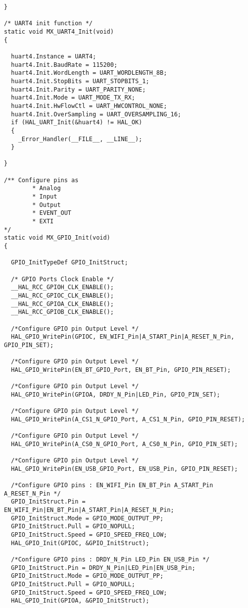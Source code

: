 \begin{lstlisting}[label=algoritmo:main.c,style = STM-code,frame=single,caption=main.c]
}

/* UART4 init function */
static void MX_UART4_Init(void)
{

  huart4.Instance = UART4;
  huart4.Init.BaudRate = 115200;
  huart4.Init.WordLength = UART_WORDLENGTH_8B;
  huart4.Init.StopBits = UART_STOPBITS_1;
  huart4.Init.Parity = UART_PARITY_NONE;
  huart4.Init.Mode = UART_MODE_TX_RX;
  huart4.Init.HwFlowCtl = UART_HWCONTROL_NONE;
  huart4.Init.OverSampling = UART_OVERSAMPLING_16;
  if (HAL_UART_Init(&huart4) != HAL_OK)
  {
    _Error_Handler(__FILE__, __LINE__);
  }

}

/** Configure pins as 
        * Analog 
        * Input 
        * Output
        * EVENT_OUT
        * EXTI
*/
static void MX_GPIO_Init(void)
{

  GPIO_InitTypeDef GPIO_InitStruct;

  /* GPIO Ports Clock Enable */
  __HAL_RCC_GPIOH_CLK_ENABLE();
  __HAL_RCC_GPIOC_CLK_ENABLE();
  __HAL_RCC_GPIOA_CLK_ENABLE();
  __HAL_RCC_GPIOB_CLK_ENABLE();

  /*Configure GPIO pin Output Level */
  HAL_GPIO_WritePin(GPIOC, EN_WIFI_Pin|A_START_Pin|A_RESET_N_Pin, GPIO_PIN_SET);

  /*Configure GPIO pin Output Level */
  HAL_GPIO_WritePin(EN_BT_GPIO_Port, EN_BT_Pin, GPIO_PIN_RESET);

  /*Configure GPIO pin Output Level */
  HAL_GPIO_WritePin(GPIOA, DRDY_N_Pin|LED_Pin, GPIO_PIN_SET);

  /*Configure GPIO pin Output Level */
  HAL_GPIO_WritePin(A_CS1_N_GPIO_Port, A_CS1_N_Pin, GPIO_PIN_RESET);

  /*Configure GPIO pin Output Level */
  HAL_GPIO_WritePin(A_CS0_N_GPIO_Port, A_CS0_N_Pin, GPIO_PIN_SET);

  /*Configure GPIO pin Output Level */
  HAL_GPIO_WritePin(EN_USB_GPIO_Port, EN_USB_Pin, GPIO_PIN_RESET);

  /*Configure GPIO pins : EN_WIFI_Pin EN_BT_Pin A_START_Pin A_RESET_N_Pin */
  GPIO_InitStruct.Pin = EN_WIFI_Pin|EN_BT_Pin|A_START_Pin|A_RESET_N_Pin;
  GPIO_InitStruct.Mode = GPIO_MODE_OUTPUT_PP;
  GPIO_InitStruct.Pull = GPIO_NOPULL;
  GPIO_InitStruct.Speed = GPIO_SPEED_FREQ_LOW;
  HAL_GPIO_Init(GPIOC, &GPIO_InitStruct);

  /*Configure GPIO pins : DRDY_N_Pin LED_Pin EN_USB_Pin */
  GPIO_InitStruct.Pin = DRDY_N_Pin|LED_Pin|EN_USB_Pin;
  GPIO_InitStruct.Mode = GPIO_MODE_OUTPUT_PP;
  GPIO_InitStruct.Pull = GPIO_NOPULL;
  GPIO_InitStruct.Speed = GPIO_SPEED_FREQ_LOW;
  HAL_GPIO_Init(GPIOA, &GPIO_InitStruct);


\end{lstlisting}
